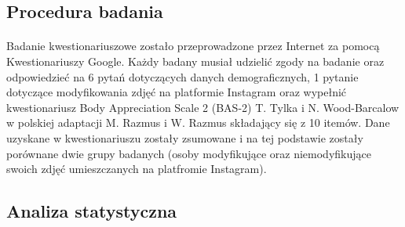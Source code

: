 \documentclass[12pt,a4paper,final,oneside,onecolumn,titlepage]{article}
\begin{document}
\subsection*{\normalsize{\textbf{Procedura badania}}}
\paragraph{}
Badanie kwestionariuszowe zostało przeprowadzone przez Internet za pomocą Kwestionariuszy Google. Każdy badany musiał udzielić zgody na badanie oraz odpowiedzieć na 6 pytań dotyczących danych demograficznych, 1 pytanie dotyczące modyfikowania zdjęć na platformie Instagram oraz wypełnić kwestionariusz Body Appreciation Scale 2 (BAS-2) T. Tylka i N. Wood-Barcalow w polskiej adaptacji M. Razmus i W. Razmus składający się z 10 itemów. Dane uzyskane w kwestionariuszu zostały zsumowane i na tej podstawie zostały porównane dwie grupy badanych (osoby modyfikujące oraz niemodyfikujące swoich zdjęć umieszczanych na platfromie Instagram).
\subsection*{\normalsize{\textbf{Analiza statystyczna}}}
\end{document}
